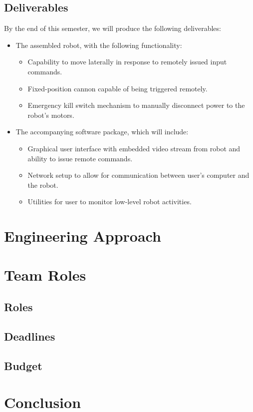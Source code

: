 \documentclass[letterpaper,12pt]{article}
\begin{document}
\subsection{Deliverables}
By the end of this semester, we will produce the following deliverables:
\begin{itemize}
\item The assembled robot, with the following functionality:
  \begin{itemize}
  \item Capability to move laterally in response to remotely issued input commands.
  \item Fixed-position cannon capable of being triggered remotely.
  \item Emergency kill switch mechanism to manually disconnect power to the robot's motors.
  \end{itemize}
\item The accompanying software package, which will include:
  \begin{itemize}
  \item Graphical user interface with embedded video stream from robot and ability to issue remote commands.
  \item Network setup to allow for communication between user's computer and the robot.
  \item Utilities for user to monitor low-level robot activities.
  \end{itemize}
\end{itemize}

\section{Engineering Approach}
\subsection{} %
\subsection{}
\subsection{}

\section{Team Roles}
\subsection{Roles}
\subsection{Deadlines}
\subsection{Budget}

\section{Conclusion}
\end{document}
